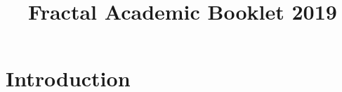 \documentclass[10pt, a4paper]{book}
\title{Fractal Academic Booklet 2019}
\author{}
\date{}
\newcommand{\chaptertitle}[1]{
    \stepcounter{chapter}
    \chapter*{\thechapter\hspace{3mm}#1}\addcontentsline{toc}{chapter}{\thechapter\hspace{3mm}#1}
}
\begin{document}

\begingroup
\let\cleardoublepage\clearpage
\tableofcontents
\endgroup
\chapter{Introduction}


\newpage
\end{document}

